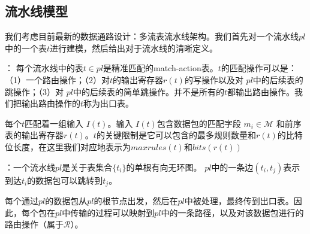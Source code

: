 



\subsection{流水线模型}
\label{subsec:pipeline-model}

我们考虑目前最新的数据通路设计：多流表流水线架构。我们首先对一个流水线$pl$中的一个表$t$进行建模，然后给出对于流水线的清晰定义。


： 每个流水线中的表$t \in pl$是精准匹配的match-action表。$t$的匹配操作可以是：（1）一个路由操作；（2）对$t$的输出寄存器$r(t)$的写操作以及对 $pl$中的后续表的跳操作；（3）对 $pl$中的后续表的简单跳操作。并不是所有的$t$都输出路由操作。我们把输出路由操作的$t$称为出口表。

每个$t$匹配着一组输入 $I(t)$。输入 $I(t)$包含数据包的匹配字段 $m_i \in \mathcal{M}$ 和前序表的输出寄存器$r(t)$。$t$的关键限制是它可以包含的最多规则数量和$r(t)$的比特位长度，在这里我们对应地表示为$maxrules(t)$和$bits(r(t))$ 

：一个流水线$pl$是关于表集合$\{t_i\}$的单根有向无环图。 $pl$中的一条边$(t_i, t_j)$表示到达$t_i$的数据包可以跳转到$t_j$。


每个通过$pl$的数据包从$pl$的根节点出发，然后在$pl$中被处理，最终传到出口表。因此，每个包在$pl$中传输的过程可以映射到$pl$中的一条路径，以及对该数据包进行的路由操作（属于$\mathcal{R}$）。

